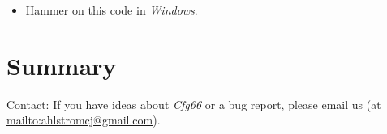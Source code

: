 \documentclass[
 11pt,
 twoside,
 a4paper,
 final                                 %
]{article}
\begin{document}
   \begin{itemize}
      \item Hammer on this code in \textsl{Windows}.
   \end{itemize}








\section{Summary}
\label{sec:summary}

   Contact: If you have ideas about \textsl{Cfg66} or a bug report,
   please email us (at \url{mailto:ahlstromcj@gmail.com}).




\printindex
\end{document}
